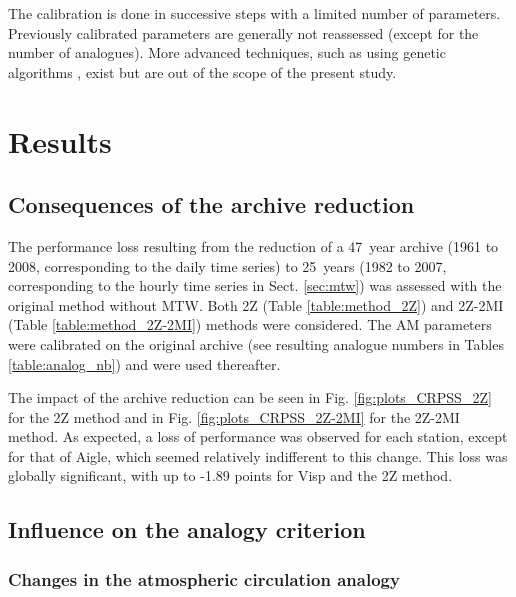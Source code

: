\documentclass[hess, manuscript]{copernicus}
\begin{document}
	The calibration is done in successive steps with a limited number of parameters. Previously calibrated parameters are generally not reassessed (except for the number of analogues). More advanced techniques, such as using genetic algorithms \citep{Horton2016}, exist but are out of the scope of the present study.
	
	
	\section{Results}
	\label{sec:results}
	
	\subsection{Consequences of the archive reduction}
	\label{sec:archive_reduction}
	
	The performance loss resulting from the reduction of a 47~year archive (1961 to 2008, corresponding to the daily time series) to 25~years (1982 to 2007, corresponding to the hourly time series in Sect. \ref{sec:mtw}) was assessed with the original method without MTW. Both 2Z (Table \ref{table:method_2Z}) and 2Z-2MI (Table \ref{table:method_2Z-2MI}) methods were considered. The AM parameters were calibrated on the original archive (see resulting analogue numbers in Tables \ref{table:analog_nb}) and were used thereafter.
	
	The impact of the archive reduction can be seen in Fig. \ref{fig:plots_CRPSS_2Z} for the 2Z method and in Fig. \ref{fig:plots_CRPSS_2Z-2MI} for the 2Z-2MI method. As expected, a loss of performance was observed for each station, except for that of Aigle, which seemed relatively indifferent to this change. This loss was globally significant, with up to -1.89 points for Visp and the 2Z method. 
	
	
	\subsection{Influence on the analogy criterion}
	\label{sec:influence_criteria}
	
	\subsubsection{Changes in the atmospheric circulation analogy}
	\label{sec:perf_2Z}
	
\end{document}
